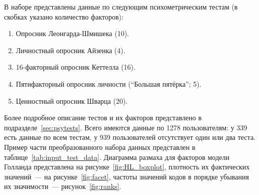В наборе представлены данные по следующим психометрическим тестам (в скобках указано количество факторов):
\begin{enumerate}[noitemsep, topsep=4pt]
    \item Опросник Леонгарда-Шмишека (10).
    \item Личностный опросник Айзенка (4).
    \item 16-факторный опросник Кеттелла (16).
    \item Пятифакторный опросник личности (\enquote{Большая пятёрка}; 5).
    \item Ценностный опросник Шварца (20).
\end{enumerate}
Более подробное описание тестов и их факторов представлено в подразделе~\ref{sec:psytests}. Всего имеются данные по 1278 пользователям: у 339 есть данные по всем тестам, у 939 пользователей отсутствует один или два теста. Пример части преобразованного набора данных представлен в таблице~\ref{tab:input_test_data}. Диаграмма размаха для факторов модели Голланда представлена на рисунке~\ref{fig:HL_boxplot}, плотность их фактических значений~--- на рисунке~\ref{fig:facet}, частоты значений кодов в порядке убывания их значимости~--- рисунок~\ref{fig:ranks}. 

